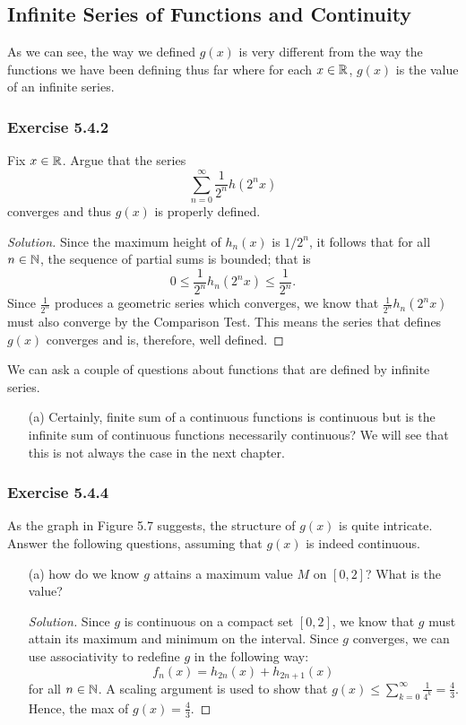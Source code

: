 \subsection{Infinite Series of Functions and Continuity}
As we can see, the way we defined \( g(x)  \) is very different from the way the functions we have been defining thus far where for each \( x \in \mathbb{R}  \), \( g(x)   \) is the value of an infinite series.

\subsubsection{Exercise 5.4.2} Fix \( x \in \mathbb{R}  \). Argue that the series 
\[  \sum_{ n=0  }^{ \infty  } \frac{ 1 }{ 2^n } h(2^n x) \]
converges and thus \( g(x)  \) is properly defined. 

\begin{proof}[Solution]
Since the maximum height of \( h_n(x)  \) is \( 1 / 2^n  \), it follows that for all \( n \in \mathbb{N}  \), the sequence of partial sums is bounded; that is
\[ 0 \leq \frac{ 1 }{ 2^n  } h_n(2^n x) \leq \frac{ 1 }{ 2^n  }.\]
Since \( \frac{ 1 }{ 2^n  }  \) produces a geometric series which converges, we know that \( \frac{ 1 }{ 2^n  } h_n (2^n x) \) must also converge by the Comparison Test. This means the series that defines \( g(x)  \) converges and is, therefore, well defined.
\end{proof}

We can ask a couple of questions about functions that are defined by infinite series. 
\begin{enumerate}
    \item[(a)] Certainly, finite sum of a continuous functions is continuous but is the infinite sum of continuous functions necessarily continuous? We will see that this is not always the case in the next chapter. 
\end{enumerate}

 \subsubsection{Exercise 5.4.4} As the graph in Figure 5.7 suggests, the structure of \( g(x)  \) is quite intricate. Answer the following questions, assuming that \( g(x) \) is indeed continuous. \begin{enumerate}
    \item[(a)] how do we know \( g  \) attains a maximum value \( M  \) on \( [0,2]  \)?  What is the value? 
        \begin{proof}[Solution]
        Since \(  g \) is continuous on a compact set \( [0,2]  \), we know that \( g  \) must attain its maximum and minimum on the interval. Since \( g  \) converges, we can use associativity to redefine \( g \) in the following way:
        \[  f_n (x) = h_{2n}(x) + h_{2n+1}(x)  \] for all \(  n \in \mathbb{N}  \). A scaling argument is used to show that \( g(x) \leq \sum_{ k=0 }^{ \infty  } \frac{ 1 }{ 4^k } = \frac{ 4 }{ 3 }. \) Hence, the max of \( g(x)  = \frac{ 4 }{ 3 }. \) 
        \end{proof}
\end{enumerate}

